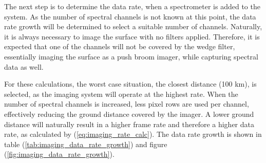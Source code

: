The next step is to determine the data rate, when a spectrometer is added to the system. As the number of spectral channels is not known at this point, the data rate growth will be determined to select a suitable number of channels. Naturally, it is always necessary to image the surface with no filters applied. Therefore, it is expected that one of the channels will not be covered by the wedge filter, essentially imaging the surface as a push broom imager, while capturing spectral data as well.

For these calculations, the worst case situation, the closest distance (100 km), is selected, as the imaging system will operate at the highest rate. When the number of spectral channels is increased, less pixel rows are used per channel, effectively reducing the ground distance covered by the imager. A lower ground distance will naturally result in a higher frame rate and therefore a higher data rate, as calculated by (\ref{eq:imaging_rate_calc}). The data rate growth is shown in table (\ref{tab:imaging_data_rate_growth}) and figure (\ref{fig:imaging_data_rate_growth}).
\begin{table}[htb!]
  \centering
    \caption{The data rate growth at 100 km, varying spectrometer channels.}
  \label{tab:imaging_data_rate_growth}%
\end{table}%

